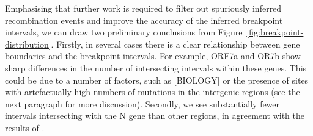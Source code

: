 \documentclass{article}
\begin{document}
Emphasising that further work is required to filter out spuriously inferred
recombination events and improve the accuracy of the inferred breakpoint
intervals, we can draw two preliminary conclusions from
Figure~\ref{fig:breakpoint-distribution}.
Firstly, in several cases there is a clear relationship between
gene boundaries and the breakpoint intervals. For example, ORF7a and OR7b
show sharp differences in the number of intersecting intervals within
these genes. This could be due to a number of factors, such as [BIOLOGY]
or the presence of sites with artefactually high numbers of mutations
in the intergenic regions (see the next paragraph for more discussion).
Secondly, we see substantially fewer intervals intersecting with the N
gene than other regions, in agreement with the results of
\cite{Turakhia2022-it}.
\end{document}
